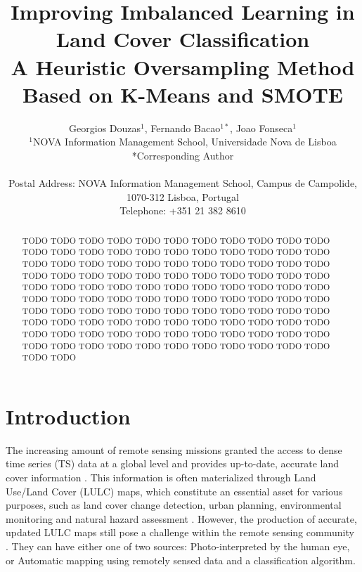\documentclass[parskip=full]{scrartcl}
\title{Improving Imbalanced Learning in Land Cover Classification \\ 
	\LARGE{A Heuristic Oversampling Method Based on K-Means and SMOTE}}
\author{
	Georgios Douzas\(^{1}\), Fernando Bacao\(^{1*}\), Joao Fonseca\(^{1}\)
	\\
	\small{\(^{1}\)NOVA Information Management School, Universidade Nova de Lisboa}
	\\
	\small{*Corresponding Author}
	\\
	\\
	\small{Postal Address: NOVA Information Management School, Campus de Campolide, 1070-312 Lisboa, Portugal}
	\\
	\small{Telephone: +351 21 382 8610}
}
\date{}
\begin{document}
\maketitle

\begin{abstract}
	TODO TODO TODO TODO TODO TODO TODO TODO TODO TODO TODO TODO TODO TODO TODO TODO
	TODO TODO TODO TODO TODO TODO TODO TODO TODO TODO TODO TODO TODO TODO TODO TODO
	TODO TODO TODO TODO TODO TODO TODO TODO TODO TODO TODO TODO TODO TODO TODO TODO
	TODO TODO TODO TODO TODO TODO TODO TODO TODO TODO TODO TODO TODO TODO TODO TODO
	TODO TODO TODO TODO TODO TODO TODO TODO TODO TODO TODO TODO TODO TODO TODO TODO
	TODO TODO TODO TODO TODO TODO TODO TODO TODO TODO TODO TODO TODO TODO TODO TODO
	TODO TODO TODO TODO TODO TODO TODO TODO TODO TODO TODO TODO TODO TODO TODO TODO
\end{abstract}

\section{Introduction}


The increasing amount of remote sensing missions granted the access to dense
time series (TS) data at a global level and provides up-to-date, accurate land
cover information \cite{Drusch2012}. This information is often
materialized through Land Use/Land Cover (LULC) maps, which constitute an
essential asset for various purposes, such as land cover change detection,
urban planning, environmental monitoring and natural hazard assessment
\cite{Khatami2016}. However, the production of accurate, updated LULC maps
still pose a challenge within the remote sensing community
\cite{Wulder2018}. They can have either one of two sources:
Photo-interpreted by the human eye, or Automatic mapping using remotely sensed
data and a classification algorithm.
\end{document}
